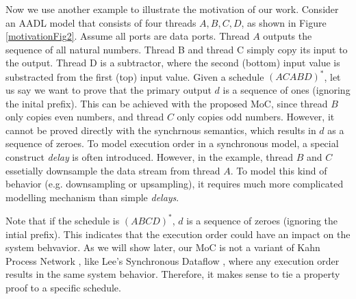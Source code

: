 Now we use another example to illustrate the motivation of our work.
Consider an AADL model that consists of four threads $A, B, C, D$, as shown in Figure \ref{motivationFig2}. Assume all ports are data ports. Thread $A$ outputs the sequence of all natural numbers. Thread B and thread C simply copy its input to the output. Thread D is a subtractor, where the second (bottom) input value is substracted from the first (top) input value. Given a schedule $(ACABD)^*$, let us say we want to prove that the primary output $d$ is a sequence of ones (ignoring the inital prefix). This can be achieved with the proposed MoC, since thread $B$ only copies even numbers, and thread $C$ only copies odd numbers. However, it cannot be proved directly with the  synchrnous semantics, which results in $d$ as a sequence of zeroes.  To model execution order in a synchronous model, a special construct \emph{delay} is often introduced. However, in the example, thread $B$ and $C$ essetially downsample the data stream from thread $A$. To model this kind of behavior (e.g. downsampling or upsampling), it requires much more complicated modelling mechanism than simple \emph{delays}. 

Note that if the schedule is $(ABCD)^*$, $d$ is a sequence of zeroes (ignoring the intial prefix). This indicates that the execution order could have an impact on the system behvavior. As we will show later, our MoC is not a variant of Kahn Process Network \cite{KPN}, like Lee's Synchronous Dataflow \cite{SDF}, where any execution order results in the same system behavior. Therefore, it makes sense to tie a property proof to a specific schedule.


 
  